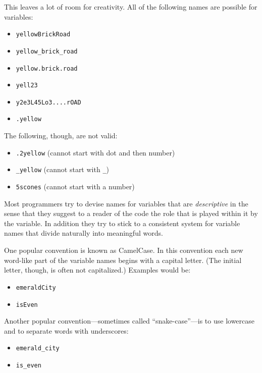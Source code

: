 \documentclass[]{book}
\providecommand{\tightlist}{%
  \setlength{\itemsep}{0pt}\setlength{\parskip}{0pt}}
\theoremstyle{definition}
\theoremstyle{definition}
\theoremstyle{definition}
\theoremstyle{remark}
\begin{document}
{This leaves a lot of room for creativity. All of the following names are
possible for variables:

\begin{itemize}
\tightlist
\item
  \texttt{yellowBrickRoad}
\item
  \texttt{yellow\_brick\_road}
\item
  \texttt{yellow.brick.road}
\item
  \texttt{yell23}
\item
  \texttt{y2e3L45Lo3....rOAD}
\item
  \texttt{.yellow}
\end{itemize}

The following, though, are not valid:

\begin{itemize}
\tightlist
\item
  \texttt{.2yellow} (cannot start with dot and then number)
\item
  \texttt{\_yellow} (cannot start with \texttt{\_})
\item
  \texttt{5scones} (cannot start with a number)
\end{itemize}

Most programmers try to devise names for variables that are
\emph{descriptive} in the sense that they suggest to a reader of the
code the role that is played within it by the variable. In addition they
try to stick to a consistent system for variable names that divide
naturally into meaningful words.

One popular convention is known as CamelCase. In this
convention each new word-like part of the variable names begins with a
capital letter. (The initial letter, though, is often not capitalized.)
Examples would be:

\begin{itemize}
\tightlist
\item
  \texttt{emeraldCity}
\item
  \texttt{isEven}
\end{itemize}

Another popular convention---sometimes called ``snake-case''---is to use
lowercase and to separate words with underscores:

\begin{itemize}
\tightlist
\item
  \texttt{emerald\_city}
\item
  \texttt{is\_even}
\end{itemize}

}
\end{document}
